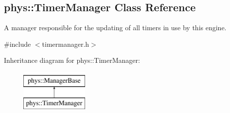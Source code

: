 \hypertarget{classphys_1_1TimerManager}{
\subsection{phys::TimerManager Class Reference}
\label{dc/d66/classphys_1_1TimerManager}
}


A manager responsible for the updating of all timers in use by this engine.  




{\ttfamily \#include $<$timermanager.h$>$}

Inheritance diagram for phys::TimerManager:\begin{figure}[H]
\begin{center}
\leavevmode
\includegraphics[height=2.000000cm]{dc/d66/classphys_1_1TimerManager}
\end{center}
\end{figure}
